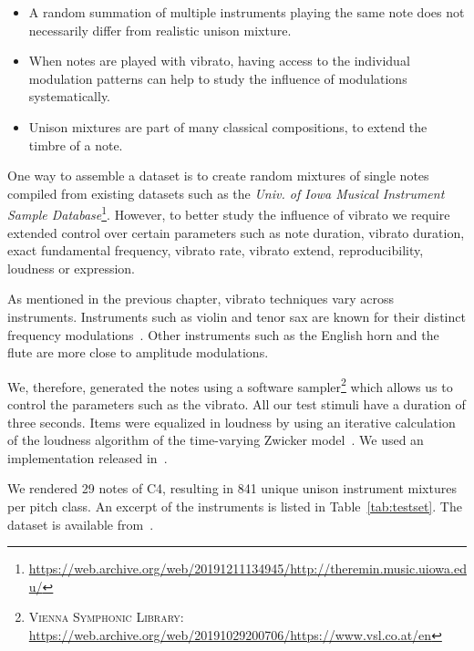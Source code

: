 \begin{itemize}
  \item A random summation of multiple instruments playing the same note does not necessarily differ from realistic unison mixture.
  \item When notes are played with vibrato, having access to the individual modulation patterns can help to study the influence of modulations systematically.
  \item Unison mixtures are part of many classical compositions, to extend the timbre of a note.
\end{itemize}

\par
One way to assemble a dataset is to create random mixtures of single notes compiled from existing datasets such as the \emph{Univ. of Iowa Musical Instrument Sample Database}\footnote{\url{https://web.archive.org/web/20191211134945/http://theremin.music.uiowa.edu/}}.
However, to better study the influence of vibrato we require extended control over certain parameters such as note duration, vibrato duration, exact fundamental frequency, vibrato rate, vibrato extend, reproducibility, loudness or expression.
\par
As mentioned in the previous chapter, vibrato techniques vary across instruments. 
Instruments such as violin and tenor sax are known for their distinct frequency modulations~\cite{gilbert05}.
Other instruments such as the English horn and the flute are more close to amplitude modulations.
\par
We, therefore, generated the notes using a software sampler\footnote{\textsc{Vienna Symphonic Library}: \url{https://web.archive.org/web/20191029200706/https://www.vsl.co.at/en}} which allows us to control the parameters such as the vibrato.
All our test stimuli have a duration of three seconds.
Items were equalized in loudness by using an iterative calculation of the loudness algorithm of the time-varying Zwicker model~\cite{zwicker13}. 
We used an implementation released in~\cite{genesis12}. 
\par
We rendered 29 notes of C4, resulting in 841 unique unison instrument mixtures per pitch class.
An excerpt of the instruments is listed in Table~\ref{tab:testset}.
The dataset is available from~\cite{oss_unison}.

